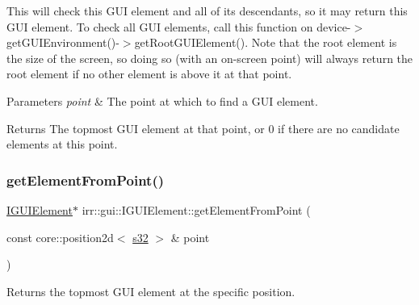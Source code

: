 This will check this G\+UI element and all of its descendants, so it may return this G\+UI element. To check all G\+UI elements, call this function on device-\/$>$get\+G\+U\+I\+Environment()-\/$>$get\+Root\+G\+U\+I\+Element(). Note that the root element is the size of the screen, so doing so (with an on-\/screen point) will always return the root element if no other element is above it at that point. 
\begin{DoxyParams}{Parameters}
{\em point} & The point at which to find a G\+UI element. \\
\hline
\end{DoxyParams}
\begin{DoxyReturn}{Returns}
The topmost G\+UI element at that point, or 0 if there are no candidate elements at this point. 
\end{DoxyReturn}
\mbox{\label{classirr_1_1gui_1_1IGUIElement_ae49f8a5228ce0c18e0c98becf74ee56a}} 
\subsubsection{\texorpdfstring{get\+Element\+From\+Point()}{getElementFromPoint()}\hspace{0.1cm}{\footnotesize\ttfamily [2/2]}}
{\footnotesize\ttfamily \hyperlink{classirr_1_1gui_1_1IGUIElement}{I\+G\+U\+I\+Element}$\ast$ irr\+::gui\+::\+I\+G\+U\+I\+Element\+::get\+Element\+From\+Point (\begin{DoxyParamCaption}\item[{const core\+::position2d$<$ \hyperlink{namespaceirr_ac66849b7a6ed16e30ebede579f9b47c6}{s32} $>$ \&}]{point }\end{DoxyParamCaption})\hspace{0.3cm}{\ttfamily [inline]}}



Returns the topmost G\+UI element at the specific position. 

